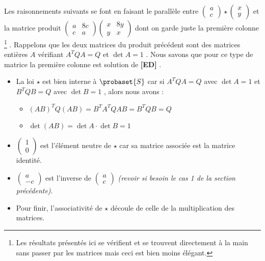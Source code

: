 \medskip

Les raisonnements suivants se font en faisant le parallèle entre 
$\begin{pmatrix} 
  a \\ 
  c 
\end{pmatrix}
\star
\begin{pmatrix} 
  x \\ 
  y 
\end{pmatrix}$
et la matrice produit
$\begin{pmatrix} 
  a & 8c \\ 
  c & a 
\end{pmatrix}
\begin{pmatrix} 
  x & 8y \\ 
  y & x 
\end{pmatrix}$
dont on garde juste la première colonne
\footnote{
	Les résultats présentés ici se vérifient et se trouvent directement à la main sans passer par les matrices mais ceci est bien moins élégant.
} .
Rappelons que les deux matrices du produit précédent sont des matrices entières $A$ vérifiant $A^T Q A = Q$ et $\det A = 1$ . Nous savons que pour ce type de matrice la première colonne est solution de \textbf{[ED]} .


\begin{itemize}[label=\small\textbullet]
	\item La loi $\star$ est bien interne à $\probaset{S}$ car si $A^T Q A = Q$ avec $\det A = 1$ et $B^T Q B = Q$ avec $\det B = 1$ , alors nous avons :
	
	\begin{itemize}[label=\raisebox{.3ex}{$\centerdot$}]
		\item $(AB)^T Q (AB) = B^T A^T Q A B = B^T Q B = Q$
		
		\medskip
		\item $\det(AB) = \det A \cdot \det B = 1$
	\end{itemize}


	\medskip
	\item
	$\begin{pmatrix} 
	  1 \\ 
	  0 
	\end{pmatrix}$
	est l'élément neutre de $\star$ car sa matrice associée est la matrice identité.


	\medskip
	\item
	$\begin{pmatrix} 
	  a  \\ 
	  -c 
	\end{pmatrix}$
	est l'inverse de
	$\begin{pmatrix} 
	  a \\ 
	  c 
	\end{pmatrix}$
	\textit{(revoir si besoin le cas 1 de la section précédente)}.


	\medskip
	\item Pour finir, l'associativité de $\star$ découle de celle de la multiplication des matrices.
\end{itemize}
